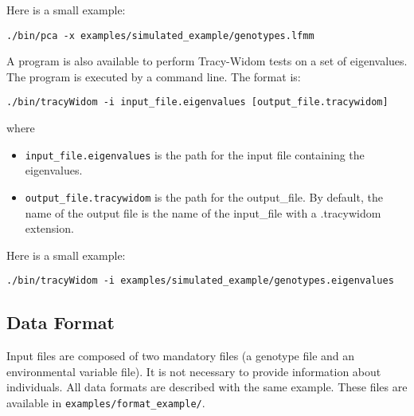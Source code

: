 \documentclass[10pt,a4paper]{article}
\begin{document}
\noindent
Here is a small example:
\begin{Verbatim}[frame=single]
./bin/pca -x examples/simulated_example/genotypes.lfmm
\end{Verbatim}

\noindent 
A program is also available to perform Tracy-Widom tests on a set of eigenvalues.
The program is executed by a command line. The format is:
\begin{Verbatim}[frame=single]
./bin/tracyWidom -i input_file.eigenvalues [output_file.tracywidom]
\end{Verbatim}
where
\begin{itemize}
\item \verb|input_file.eigenvalues| is the path for the input file containing the eigenvalues.
\item \verb|output_file.tracywidom| is the path for the output\_file.
By default, the name of the output file is the name of the input\_file with a .tracywidom extension.
\end{itemize}

\noindent
Here is a small example:
\begin{Verbatim}[frame=single]
./bin/tracyWidom -i examples/simulated_example/genotypes.eigenvalues
\end{Verbatim}

\subsection{Data Format}
Input files are composed of two mandatory files (a genotype file and an environmental variable file). 
It is not necessary to provide information about individuals.
All data formats are described with the same
example. These files are available in \verb|examples/format_example/|.
\end{document}

